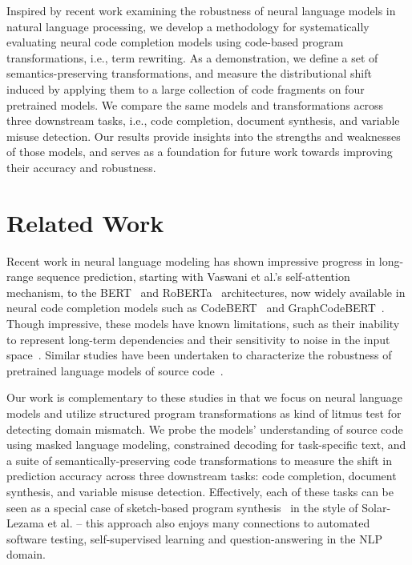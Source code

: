 \documentclass[usenames,dvipsnames]{article} %
\begin{document}
  Inspired by recent work examining the robustness of neural language models in natural language processing, we develop a methodology for systematically evaluating neural code completion models using code-based program transformations, i.e., term rewriting. As a demonstration, we define a set of semantics-preserving transformations, and measure the distributional shift induced by applying them to a large collection of code fragments on four pretrained models. We compare the same models and transformations across three downstream tasks, i.e., code completion, document synthesis, and variable misuse detection. Our results provide insights into the strengths and weaknesses of those models, and serves as a foundation for future work towards improving their accuracy and robustness.

  \section{Related Work}\label{sec:related_work}

  Recent work in neural language modeling has shown impressive progress in long-range sequence prediction, starting with Vaswani et al.'s self-attention~\citep{vaswani2017attention} mechanism, to the BERT~\citep{devlin2018bert} and RoBERTa~\citep{liu2019roberta} architectures, now widely available in neural code completion models such as CodeBERT~\citep{feng2020codebert} and GraphCodeBERT~\citep{guo2021graphcodebert}. Though impressive, these models have known limitations, such as their inability to represent long-term dependencies and their sensitivity to noise in the input space~\cite{sun2020adv}. Similar studies have been undertaken to characterize the robustness of pretrained language models of source code~\citep{hellendoorn2017deep, bielik2020adversarial, zhou2021adversarial}.

  Our work is complementary to these studies in that we focus on neural language models and utilize structured program transformations as kind of litmus test for detecting domain mismatch. We probe the models' understanding of source code using masked language modeling, constrained decoding for task-specific text, and a suite of semantically-preserving code transformations to measure the shift in prediction accuracy across three downstream tasks: code completion, document synthesis, and variable misuse detection. Effectively, each of these tasks can be seen as a special case of sketch-based program synthesis~\citep{solar2008program} in the style of Solar-Lezama et al. -- this approach also enjoys many connections to automated software testing, self-supervised learning and question-answering in the NLP domain.
\end{document}

